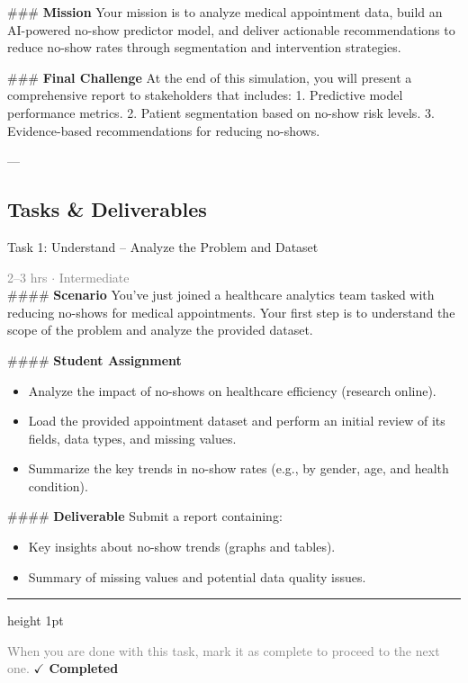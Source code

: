 \documentclass[10pt,a4paper]{article}
\begin{document}
\#\#\# \textbf{Mission}  
Your mission is to analyze medical appointment data, build an AI-powered no-show predictor model, and deliver actionable recommendations to reduce no-show rates through segmentation and intervention strategies.  

\#\#\# \textbf{Final Challenge}  
At the end of this simulation, you will present a comprehensive report to stakeholders that includes:  
1. Predictive model performance metrics.  
2. Patient segmentation based on no-show risk levels.  
3. Evidence-based recommendations for reducing no-shows.  

---

\subsection*{Tasks \& Deliverables}

\begin{taskbox}{Task 1: Understand – Analyze the Problem and Dataset}

    {\small \textcolor{gray}{2--3 hrs $\cdot$ Intermediate}}\\[12pt]

    \#\#\#\# \textbf{Scenario}  
You’ve just joined a healthcare analytics team tasked with reducing no-shows for medical appointments. Your first step is to understand the scope of the problem and analyze the provided dataset.  

\#\#\#\# \textbf{Student Assignment}  
\begin{itemize}
    \item Analyze the impact of no-shows on healthcare efficiency (research online).  
    \item Load the provided appointment dataset and perform an initial review of its fields, data types, and missing values.  
    \item Summarize the key trends in no-show rates (e.g., by gender, age, and health condition).  
\end{itemize}

\#\#\#\# \textbf{Deliverable}  
Submit a report containing:  
\begin{itemize}
    \item Key insights about no-show trends (graphs and tables).  
    \item Summary of missing values and potential data quality issues.\par
\end{itemize}

    \vspace{16pt}

    \textcolor{cardBorder}{\hrule height 1pt}\vspace{8pt}

    \small \textcolor{gray}{When you are done with this task, mark it as complete to proceed to the next one.} \hfill \textbf{\textcolor{brandDark}{$\checkmark$ Completed}}

\end{taskbox}
\end{document}

